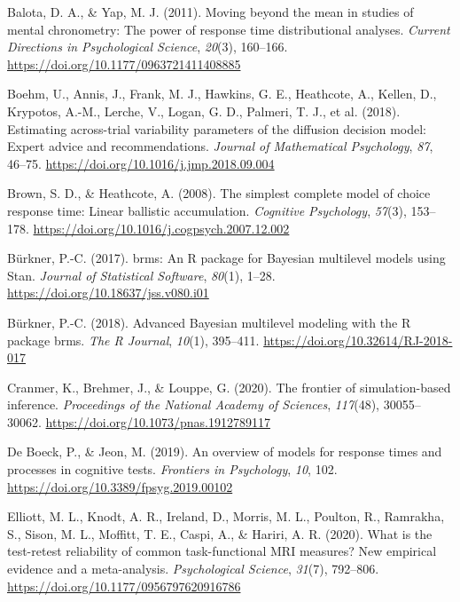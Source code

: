 \documentclass[
  jou,
  floatsintext,
  longtable,
  nolmodern,
  notxfonts,
  notimes,
  12pt,
  colorlinks=true,linkcolor=blue,citecolor=blue,urlcolor=blue]{apa7}
\newlength{\cslhangindent}
\newenvironment{CSLReferences}[2] %
 {\begin{list}{}{%
  \setlength{\itemindent}{0pt}
  \setlength{\leftmargin}{0pt}
  \setlength{\parsep}{0pt}
  \ifodd #1
   \setlength{\leftmargin}{\cslhangindent}
   \setlength{\itemindent}{-1\cslhangindent}
  \fi
  \setlength{\itemsep}{#2\baselineskip}}}
 {\end{list}}
\begin{document}
\label{refs}
\begin{CSLReferences}{1}{0}
Balota, D. A., \& Yap, M. J. (2011). Moving beyond the mean in studies
of mental chronometry: The power of response time distributional
analyses. \emph{Current Directions in Psychological Science},
\emph{20}(3), 160--166. \url{https://doi.org/10.1177/0963721411408885}

Boehm, U., Annis, J., Frank, M. J., Hawkins, G. E., Heathcote, A.,
Kellen, D., Krypotos, A.-M., Lerche, V., Logan, G. D., Palmeri, T. J.,
et al. (2018). Estimating across-trial variability parameters of the
diffusion decision model: Expert advice and recommendations.
\emph{Journal of Mathematical Psychology}, \emph{87}, 46--75.
\url{https://doi.org/10.1016/j.jmp.2018.09.004}

Brown, S. D., \& Heathcote, A. (2008). The simplest complete model of
choice response time: Linear ballistic accumulation. \emph{Cognitive
Psychology}, \emph{57}(3), 153--178.
\url{https://doi.org/10.1016/j.cogpsych.2007.12.002}

Bürkner, P.-C. (2017). {brms}: An {R} package for {Bayesian} multilevel
models using {Stan}. \emph{Journal of Statistical Software},
\emph{80}(1), 1--28. \url{https://doi.org/10.18637/jss.v080.i01}

Bürkner, P.-C. (2018). Advanced {Bayesian} multilevel modeling with the
{R} package {brms}. \emph{The R Journal}, \emph{10}(1), 395--411.
\url{https://doi.org/10.32614/RJ-2018-017}

Cranmer, K., Brehmer, J., \& Louppe, G. (2020). The frontier of
simulation-based inference. \emph{Proceedings of the National Academy of
Sciences}, \emph{117}(48), 30055--30062.
\url{https://doi.org/10.1073/pnas.1912789117}

De Boeck, P., \& Jeon, M. (2019). An overview of models for response
times and processes in cognitive tests. \emph{Frontiers in Psychology},
\emph{10}, 102. \url{https://doi.org/10.3389/fpsyg.2019.00102}

Elliott, M. L., Knodt, A. R., Ireland, D., Morris, M. L., Poulton, R.,
Ramrakha, S., Sison, M. L., Moffitt, T. E., Caspi, A., \& Hariri, A. R.
(2020). What is the test-retest reliability of common task-functional
{MRI} measures? {New} empirical evidence and a meta-analysis.
\emph{Psychological Science}, \emph{31}(7), 792--806.
\url{https://doi.org/10.1177/0956797620916786}


\end{CSLReferences}
\end{document}

